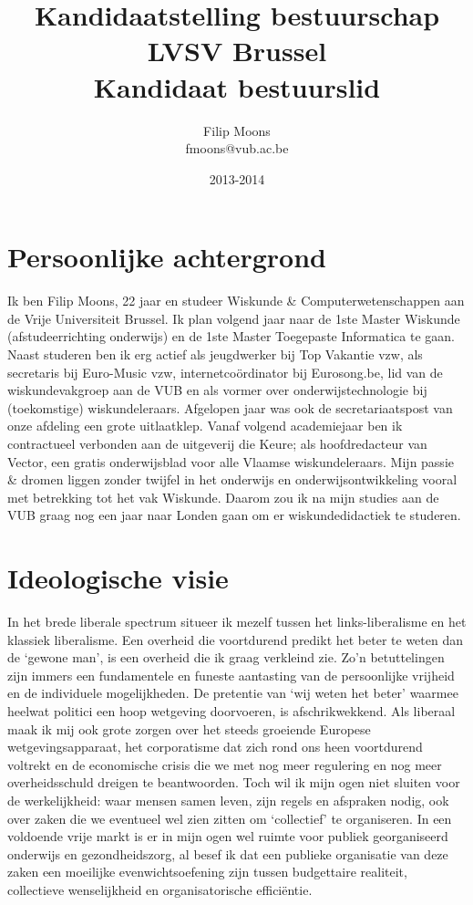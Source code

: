 \documentclass[10pt,a4paper]{article}
\theoremstyle{definition}
\theoremstyle{remark}
\begin{document}
\title{Kandidaatstelling bestuurschap LVSV Brussel\\Kandidaat bestuurslid}
\author{Filip Moons\\fmoons@vub.ac.be}
\date{2013-2014}
\maketitle

\section*{Persoonlijke achtergrond}
Ik ben Filip Moons, 22 jaar en studeer Wiskunde \& Computerwetenschappen aan de Vrije Universiteit
Brussel. Ik plan volgend jaar naar de 1ste Master Wiskunde (afstudeerrichting onderwijs) en de 1ste Master Toegepaste Informatica te gaan. Naast studeren ben ik erg actief als jeugdwerker bij Top Vakantie vzw, als secretaris bij Euro-Music vzw, internetco\"{o}rdinator bij Eurosong.be, lid van de wiskundevakgroep aan de VUB en als vormer over onderwijstechnologie bij (toekomstige) wiskundeleraars. Afgelopen jaar was ook de secretariaatspost van onze afdeling een grote uitlaatklep. Vanaf volgend academiejaar ben ik contractueel verbonden aan de uitgeverij die Keure; als hoofdredacteur van Vector, een gratis onderwijsblad voor alle Vlaamse wiskundeleraars. Mijn passie \& dromen liggen zonder twijfel in het onderwijs en onderwijsontwikkeling vooral met betrekking tot het vak Wiskunde. Daarom zou ik na mijn studies aan de VUB graag nog een jaar naar Londen gaan om er wiskundedidactiek te studeren.

\section*{Ideologische visie}
In het brede liberale spectrum situeer ik mezelf tussen het links-liberalisme en het klassiek liberalisme. Een overheid die voortdurend predikt het beter te weten dan de `gewone man', is een overheid die ik graag verkleind zie. Zo'n betuttelingen zijn immers een fundamentele en funeste aantasting van de persoonlijke vrijheid en de individuele mogelijkheden. De pretentie van `wij weten het beter' waarmee heelwat politici een hoop wetgeving doorvoeren, is afschrikwekkend. Als liberaal maak ik mij ook grote zorgen over het steeds groeiende Europese wetgevingsapparaat, het corporatisme dat zich rond ons heen voortdurend voltrekt en de economische crisis die we met nog meer regulering en nog meer overheidsschuld dreigen te beantwoorden. Toch wil ik mijn ogen niet sluiten voor de werkelijkheid: waar mensen samen leven, zijn regels en afspraken nodig, ook over zaken die we eventueel wel zien zitten om `collectief' te organiseren. In een voldoende vrije markt is er in mijn ogen wel ruimte voor publiek georganiseerd onderwijs en gezondheidszorg, al besef ik dat een publieke organisatie van deze zaken een moeilijke evenwichtsoefening zijn tussen budgettaire realiteit, collectieve wenselijkheid en organisatorische effici\"{e}ntie.
\end{document}
